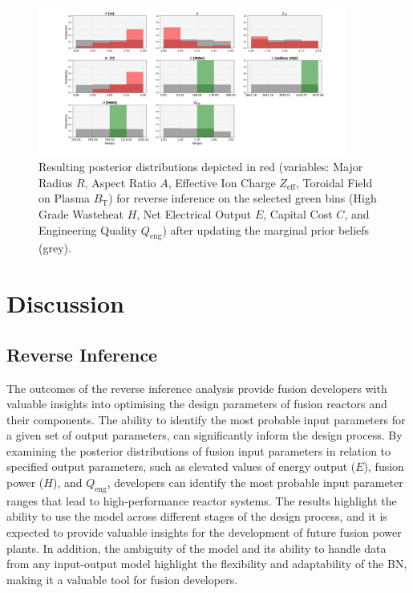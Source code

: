 \documentclass[journal]{IEEEtran}
\begin{document}
\begin{figure}[t]
    \centering
    \includegraphics[width=0.9\textwidth]{figures/TE_results/config(44)_4outputs/Figure_5_V2.png}
    \caption{Resulting posterior distributions depicted in red (variables: Major Radius $R$, Aspect Ratio $A$, Effective Ion Charge $Z_{\text{eff}}$, Toroidal Field on Plasma $B_{\text{T}}$) for reverse
    inference on the selected green bins (High Grade Wasteheat $H$, Net Electrical Output $E$, Capital Cost $C$, and Engineering Quality $Q_{\text{eng}}$) after updating the marginal prior beliefs (grey).}\label{fig:BN_case_study2}
\end{figure}

\section{Discussion}\label{sec:Discussion}


\subsection{Reverse Inference}\label{sec:disc_reverse}

The outcomes of the reverse inference analysis provide fusion developers with valuable insights into optimising the design parameters of fusion reactors and their components. The ability to identify the most probable input parameters for a given set of output parameters, can significantly inform the design process. By examining the posterior distributions of fusion input parameters in relation to specified output parameters, such as elevated values of energy output ($E$), fusion power ($H$), and $Q_{\text{eng}}$, developers can identify the most probable input parameter ranges that lead to high-performance reactor systems. The results highlight the ability to use the model across different stages of the design process, and it is expected to provide valuable insights for the development of future fusion power plants. In addition, the ambiguity of the model and its ability to handle data from any input-output model highlight the flexibility and adaptability of the BN, making it a valuable tool for fusion developers.
\end{document}
